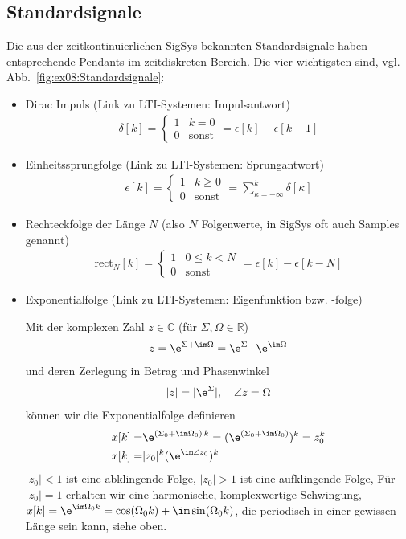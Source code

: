 \subsection*{Standardsignale}
Die aus der zeitkontinuierlichen SigSys bekannten Standardsignale haben entsprechende
Pendants im zeitdiskreten Bereich. Die vier wichtigsten sind, vgl.
Abb.~\ref{fig:ex08:Standardsignale}:
\begin{itemize}
\item Dirac Impuls (Link zu LTI-Systemen: Impulsantwort)
\begin{align}
\delta[k] =
\begin{cases}
1 & k=0\\
0 & \text{sonst}
\end{cases}
=\epsilon[k] - \epsilon[k-1]
\end{align}
\item Einheitssprungfolge (Link zu LTI-Systemen: Sprungantwort)
\begin{align}
\epsilon[k] =
\begin{cases}
1 & k \geq 0\\
0 & \text{sonst}
\end{cases}
=\sum_{\kappa=-\infty}^k \delta[\kappa]
\end{align}
\item Rechteckfolge der Länge $N$ (also $N$ Folgenwerte, in SigSys oft auch Samples genannt)
\begin{align}
\mathrm{rect}_N[k] =
\begin{cases}
1 & 0 \leq k < N\\
0 & \text{sonst}
\end{cases}
= \epsilon[k] - \epsilon[k-N]
\end{align}
\item Exponentialfolge (Link zu LTI-Systemen: Eigenfunktion bzw. -folge)

\noindent Mit der komplexen Zahl $z\in\mathbb{C}$ (für $\Sigma,\Omega\in\mathbb{R}$)
\begin{align}
z = \e^{\Sigma + \im\Omega} = \e^{\Sigma} \cdot \e^{\im\Omega}
\end{align}
und deren Zerlegung in Betrag und Phasenwinkel
\begin{align}
|z| = |\e^{\Sigma}|,\quad
\angle z = \Omega
\end{align}
können wir die Exponentialfolge definieren
\begin{align}
x[k] =& \e^{(\Sigma_0 + \im\Omega_0) \, k} = (\e^{(\Sigma_0 + \im\Omega_0)})^k = z_0^k\\
x[k] =& |z_0|^k (\e^{\im \angle z_0})^k
\end{align}
$|z_0|<1$ ist eine abklingende Folge, $|z_0|>1$ ist eine aufklingende Folge,
Für $|z_0|=1$ erhalten wir eine harmonische, komplexwertige Schwingung,
$x[k] = \e^{\im \Omega_0 k} = \cos(\Omega_0 k) + \im \sin(\Omega_0 k)$,
die periodisch in einer gewissen Länge sein kann, siehe oben.
\end{itemize}
